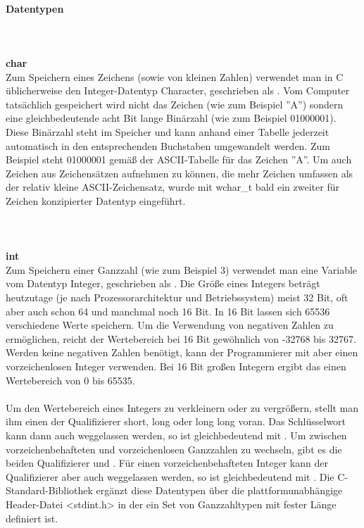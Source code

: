 \paragraph{Datentypen}
\ \\
\ \\
\textbf{char}\\
Zum Speichern eines Zeichens (sowie von kleinen Zahlen) verwendet man in C üblicherweise den Integer-Datentyp Character, geschrieben als . Vom Computer tatsächlich gespeichert wird nicht das Zeichen (wie zum Beispiel ''A'') sondern eine gleichbedeutende acht Bit lange Binärzahl (wie zum Beispiel 01000001). Diese Binärzahl steht im Speicher und kann anhand einer Tabelle jederzeit automatisch in den entsprechenden Buchstaben umgewandelt werden. Zum Beispiel steht 01000001 gemäß der ASCII-Tabelle für das Zeichen ''A''. Um auch Zeichen aus Zeichensätzen aufnehmen zu können, die mehr Zeichen umfassen als der relativ kleine ASCII-Zeichensatz, wurde mit wchar\_t bald ein zweiter für Zeichen konzipierter Datentyp eingeführt.\\
\ \\
\\
\ \\
\textbf{int}\\
Zum Speichern einer Ganzzahl (wie zum Beispiel 3) verwendet man eine Variable vom Datentyp Integer, geschrieben als . Die Größe eines Integers beträgt heutzutage (je nach Prozessorarchitektur und Betriebssystem) meist 32 Bit, oft aber auch schon 64 und manchmal noch 16 Bit. In 16 Bit lassen sich 65536 verschiedene Werte speichern. Um die Verwendung von negativen Zahlen zu ermöglichen, reicht der Wertebereich bei 16 Bit gewöhnlich von -32768 bis 32767. Werden keine negativen Zahlen benötigt, kann der Programmierer mit  aber einen vorzeichenlosen Integer verwenden. Bei 16 Bit großen Integern ergibt das einen Wertebereich von 0 bis 65535.\\
\\
Um den Wertebereich eines Integers zu verkleinern oder zu vergrößern, stellt man ihm einen der Qualifizierer short, long oder long long voran. Das Schlüsselwort  kann dann auch weggelassen werden, so ist  gleichbedeutend mit . Um zwischen vorzeichenbehafteten und vorzeichenlosen Ganzzahlen zu wechseln, gibt es die beiden Qualifizierer  und . Für einen vorzeichenbehafteten Integer kann der Qualifizierer aber auch weggelassen werden, so ist  gleichbedeutend mit . Die C-Standard-Bibliothek ergänzt diese Datentypen über die plattformunabhängige Header-Datei <stdint.h> in der ein Set von Ganzzahltypen mit fester Länge definiert ist.\\
